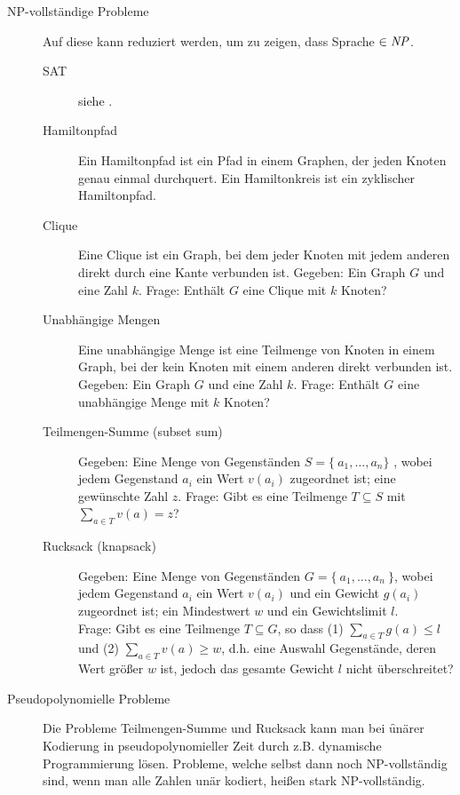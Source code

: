 \begin{description}
        \item[NP-vollständige Probleme] Auf diese kann reduziert werden, um zu zeigen, dass Sprache $\in \mathit{NP}$. 
            \begin{description}
                \item[SAT] siehe .
                \item[Hamiltonpfad] Ein Hamiltonpfad ist ein Pfad in einem Graphen, der jeden Knoten genau einmal durchquert. Ein Hamiltonkreis ist ein zyklischer Hamiltonpfad. 
                \item[Clique] Eine Clique ist ein Graph, bei dem jeder Knoten mit jedem anderen direkt durch eine Kante verbunden ist.
                    Gegeben: Ein Graph $G$ und eine Zahl $k$. Frage: Enthält $G$ eine Clique mit $k$ Knoten?
                \item[Unabhängige Mengen] Eine unabhängige Menge ist eine Teilmenge von Knoten in einem Graph, bei der kein Knoten mit einem anderen direkt verbunden ist.
                    Gegeben: Ein Graph $G$ und eine Zahl $k$. Frage: Enthält $G$ eine unabhängige Menge mit $k$ Knoten?
                \item[Teilmengen-Summe (subset sum)]  Gegeben: Eine Menge von Gegenständen $S = \{\ a_{1}, \dots, a_{n} \}$ , wobei jedem Gegenstand $a_{i}$ ein Wert $v(a_{i})$ zugeordnet ist; eine gewünschte Zahl $z$. Frage: Gibt es eine Teilmenge $T \subseteq S$ mit $\sum\limits_{a \in T} v(a) = z$?
                \item[Rucksack (knapsack)] Gegeben: Eine Menge von Gegenständen $G = \{\ a_{1}, \dots, a_{n}\ \}$, wobei jedem Gegenstand $a_{i}$ ein Wert $v(a_{i})$ und ein Gewicht $g(a_{i})$ zugeordnet ist; ein Mindestwert $w$ und ein Gewichtslimit $l$. \\
                    Frage: Gibt es eine Teilmenge $T \subseteq G$, so dass (1) $\sum\limits_{a \in T} g(a) \leq l$ und (2) $\sum\limits_{a \in T} v(a) \geq w$, d.h. eine Auswahl Gegenstände, deren Wert größer $w$ ist, jedoch das gesamte Gewicht $l$ nicht überschreitet?
            \end{description}

        \item[Pseudopolynomielle Probleme] Die Probleme Teilmengen-Summe und Rucksack kann man bei \f{unärer Kodierung} in pseudopolynomieller Zeit durch z.B. dynamische Programmierung lösen. Probleme, welche selbst dann noch NP-vollständig sind, wenn man alle Zahlen unär kodiert, heißen stark NP-vollständig. 


\end{description}

